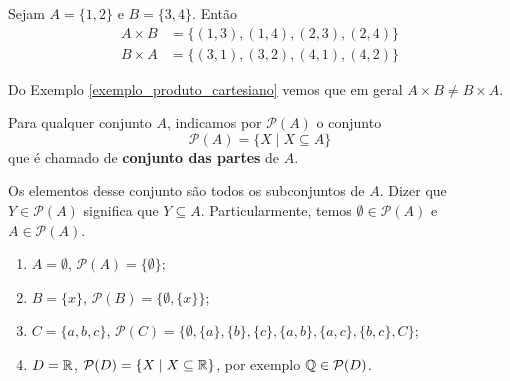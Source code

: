 \begin{exemplo}\label{exemplo_produto_cartesiano}
	Sejam $A = \{1,2\}$ e $B = \{3,4\}$. Então
	\begin{align*}
		A \times B &= \{(1,3), (1,4), (2,3), (2,4)\}\\
		B \times A &= \{(3,1), (3,2), (4,1), (4,2)\}
\end{align*}
\end{exemplo}

\begin{observacao}
	Do Exemplo \eqref{exemplo_produto_cartesiano} vemos que em geral $A \times B \neq B\times A$.
\end{observacao}

\begin{definicao}
	Para qualquer conjunto $A$, indicamos por $\mathcal{P}(A)$ o conjunto
	\[
		\mathcal{P}(A) = \{ X \mid X\subseteq A\}
	\]
	que \'e chamado de \textbf{conjunto das partes} de $A$.
\end{definicao}

Os elementos desse conjunto s{\~a}o todos os subconjuntos de $A$. Dizer que $Y\in \mathcal{P}(A)$ significa que $Y \subseteq A$. Particularmente, temos $\emptyset\in \mathcal{P}(A)$ e $A\in \mathcal{P}(A)$.

\begin{exemplos}
	\begin{enumerate}[label={\arabic*})]
		\item $A = \emptyset$, $\mathcal{P}(A) = \{\emptyset\}$;
		\item $B = \{x\}$, $\mathcal{P}(B) = \{\emptyset, \{x\}\}$;
		\item $C = \{a,b,c\}$, $\mathcal{P}(C)=\{\emptyset, \{a\}, \{b\},\{c\},\{a,b\},\{a,c\},\{b,c\},C\}$;
		\item $D=\mathbb{R}$, $\mathcal{P}(D)=\{X\mid X \subseteq \mathbb{R}\}$, por exemplo $\mathbb{Q}\in \mathcal{P}(D)$.
	\end{enumerate}	
\end{exemplos}